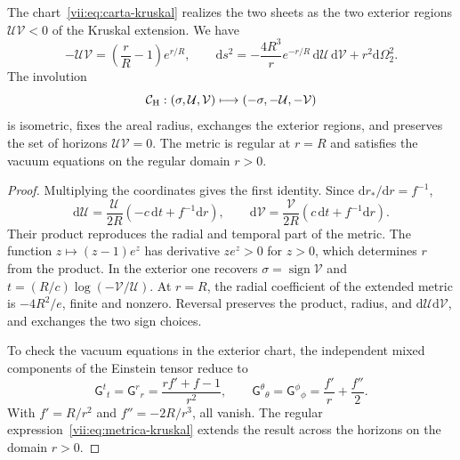 \begin{theorem}
\label{vii:thm:kruskal-hojas}
The chart~\eqref{vii:eq:carta-kruskal} realizes the two sheets as the
two exterior regions \(\mathcal U\mathcal V<0\) of the Kruskal
extension. We have
\begin{equation}
 -\mathcal U\mathcal V=\left(\frac rR-1\right)e^{r/R},\qquad
 \mathrm ds^2=-\frac{4R^3}{r}e^{-r/R}\,
                    \mathrm d\mathcal U\,\mathrm d\mathcal V
                    +r^2\mathrm d\Omega_2^2.
 \label{vii:eq:metrica-kruskal}
\end{equation}
The involution
\begin{equation}
 \mathcal C_{\rm H}:(\sigma,\mathcal U,\mathcal V)
 \longmapsto(-\sigma,-\mathcal U,-\mathcal V)
 \label{vii:eq:involucion-horizonte}
\end{equation}
is isometric, fixes the areal radius, exchanges the exterior regions, and preserves
the set of horizons \(\mathcal U\mathcal V=0\).
The metric is regular at \(r=R\) and satisfies the vacuum equations
on the regular domain \(r>0\).
\end{theorem}
\begin{proof}
Multiplying the coordinates gives the first identity. Since
\(\mathrm dr_*/\mathrm dr=f^{-1}\),
\[
 \mathrm d\mathcal U=\frac{\mathcal U}{2R}
            (-c\,\mathrm dt+f^{-1}\mathrm dr),\qquad
 \mathrm d\mathcal V=\frac{\mathcal V}{2R}
            ( c\,\mathrm dt+f^{-1}\mathrm dr).
\]
Their product reproduces the radial and temporal part of the metric.
The function \(z\mapsto(z-1)e^z\) has derivative \(ze^z>0\)
for \(z>0\), which determines \(r\) from the product.
In the exterior one recovers
\(\sigma=\operatorname{sign}\mathcal V\) and
\(t=(R/c)\log(-\mathcal V/\mathcal U)\).
At \(r=R\), the radial coefficient of the extended metric is
\(-4R^2/e\), finite and nonzero. Reversal preserves the
product, radius, and \(\mathrm d\mathcal U\mathrm d\mathcal V\),
and exchanges the two sign choices.

To check the vacuum equations in the exterior chart, the independent mixed
components of the Einstein tensor reduce to
\[
 \mathsf G^t{}_t=\mathsf G^r{}_r
 =\frac{rf'+f-1}{r^2},\qquad
 \mathsf G^\theta{}_\theta=\mathsf G^\phi{}_\phi
 =\frac{f'}r+\frac{f''}2.
\]
With \(f'=R/r^2\) and \(f''=-2R/r^3\), all vanish.
The regular expression~\eqref{vii:eq:metrica-kruskal} extends the
result across the horizons on the domain \(r>0\).
\end{proof}

